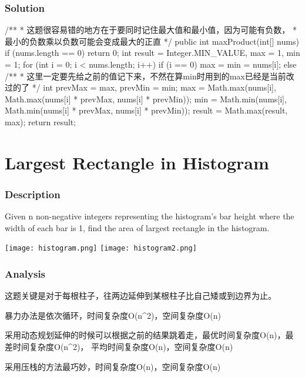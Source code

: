 \subsubsection{Solution}

\begin{Code}
/**
 * 这题很容易错的地方在于要同时记住最大值和最小值，因为可能有负数，
 * 最小的负数乘以负数可能会变成最大的正直
 */
public int maxProduct(int[] nums) {
    if (nums.length == 0) {
        return 0;
    }
    int result = Integer.MIN_VALUE, max = 1, min = 1;
    for (int i = 0; i < nums.length; i++) {
        if (i == 0) {
            max = min = nums[i];
        } else {
            /**
             * 这里一定要先给之前的值记下来，不然在算min时用到的max已经是当前改过的了
             */
            int prevMax = max, prevMin = min;
            max = Math.max(nums[i], Math.max(nums[i] * prevMax, nums[i] * prevMin));
            min = Math.min(nums[i], Math.min(nums[i] * prevMax, nums[i] * prevMin));
        }
        result = Math.max(result, max);
    }
    return result;
}
\end{Code}

\newpage

\section{Largest Rectangle in Histogram} %

\subsubsection{Description}
Given n non-negative integers representing the histogram's bar height where the width of each bar is 1, find the area of largest rectangle in the histogram.

\begin{center}
\texttt{[image: histogram.png]}
\texttt{[image: histogram2.png]}
\end{center}

\subsubsection{Analysis}
\begin{Code}
这题关键是对于每根柱子，往两边延伸到某根柱子比自己矮或到边界为止。

暴力办法是依次循环，时间复杂度O(n^2)，空间复杂度O(n)

采用动态规划延伸的时候可以根据之前的结果跳着走，最优时间复杂度O(n)，最差时间复杂度O(n^2)，
平均时间复杂度O(n)，空间复杂度O(n)

采用压栈的方法最巧妙，时间复杂度O(n)，空间复杂度O(n)
\end{Code}


